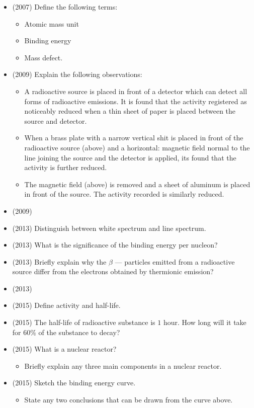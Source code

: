 \documentclass{article}
\begin{document}
\begin{itemize}
\item (2007)  Define the following terms:\begin{itemize}
\item Atomic mass unit
\item Binding energy
\item Mass defect.
\end{itemize}
\item (2009)  Explain the following observations:\begin{itemize}
\item A radioactive source is placed in front of a detector which can detect all forms of radioactive emissions. It is found that the activity registered as noticeably reduced when a thin sheet of paper is placed between the source and detector.
\item When a brass plate with a narrow vertical shit is placed in front of the radioactive source (above) and a horizontal: magnetic field normal to the line joining the source and the detector is applied, its found that the activity is further reduced.
\item The magnetic field (above) is removed and a sheet of aluminum is placed in front of the source. The activity recorded is similarly reduced.
\end{itemize}
\item (2009)  \item (2013)  Distinguish between white spectrum and line spectrum. 
\item (2013)  What is the significance of the binding energy per nucleon? 
\item (2013)  Briefly explain why the $ \beta$  — particles emitted from a radioactive source differ from the electrons obtained by thermionic emission? 
\item (2013)  \item (2015)  Define activity and half-life.
\item (2015)  The half-life of radioactive substance is $ 1$ hour.  How long will it take for $ 60\%$ of the substance to decay?
\item (2015)  What is a nuclear reactor?\begin{itemize}
\item Briefly explain any three main components in a nuclear reactor.
\end{itemize}
\item (2015)  Sketch the binding energy curve.\begin{itemize}
\item State any two conclusions that can be drawn from the curve above.

\end{itemize}
\end{itemize}
\end{document}
